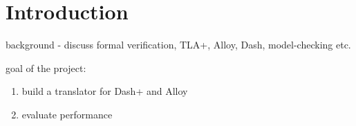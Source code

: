 \chapter{Introduction}


background - discuss formal verification, TLA+, Alloy, Dash, model-checking etc.

goal of the project:

\begin{enumerate}
	\item build a translator for Dash+ and Alloy
	\item evaluate performance
\end{enumerate}